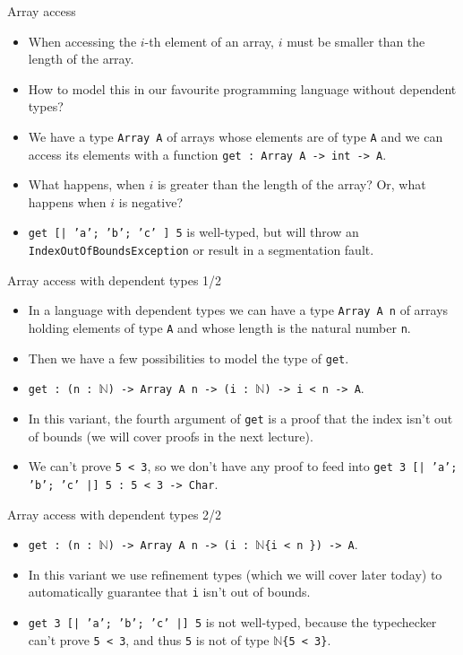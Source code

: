 \documentclass{beamer}
\newcommand{\m}[1]{\texttt{#1}}
\begin{document}
\begin{frame}{Array access}
\begin{itemize}
	\item When accessing the $i$-th element of an array, $i$ must be smaller than the length of the array.
	\item How to model this in our favourite programming language without dependent types?
	\item We have a type \m{Array A} of arrays whose elements are of type \m{A} and we can access its elements with a function \m{get :\ Array A -> int -> A}.
	\item What happens, when $i$ is greater than the length of the array? Or, what happens when $i$ is negative?
	\item \m{get [| 'a'; 'b'; 'c' ] 5} is well-typed, but will throw an \m{IndexOutOfBoundsException} or result in a segmentation fault.
\end{itemize}
\end{frame}

\begin{frame}{Array access with dependent types 1/2}
\begin{itemize}
	\item In a language with dependent types we can have a type \m{Array A n} of arrays holding elements of type \m{A} and whose length is the natural number \m{n}.
	\item Then we have a few possibilities to model the type of \m{get}.
	\item \m{get :\ (n :\ $\mathbb{N}$) -> Array A n -> (i :\ $\mathbb{N}$) -> i < n -> A}.
	\item In this variant, the fourth argument of \m{get} is a proof that the index isn't out of bounds (we will cover proofs in the next lecture).
	\item We can't prove \m{5 < 3}, so we don't have any proof to feed into \m{get 3 [| 'a'; 'b'; 'c' |] 5 :\ 5 < 3 -> Char}.
\end{itemize}
\end{frame}

\begin{frame}{Array access with dependent types 2/2}
\begin{itemize}
	\item \m{get :\ (n :\ $\mathbb{N}$) -> Array A n -> (i :\ $\mathbb{N}$\{i < n \}) -> A}.
	\item In this variant we use refinement types (which we will cover later today) to automatically guarantee that \m{i} isn't out of bounds.
	\item \m{get 3 [| 'a'; 'b'; 'c' |] 5} is not well-typed, because the typechecker can't prove \m{5 < 3}, and thus \m{5} is not of type \m{$\mathbb{N}$\{5 < 3\}}.
\end{itemize}
\end{frame}
\end{document}
